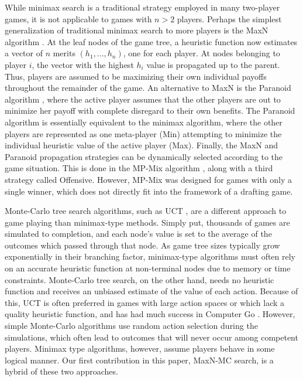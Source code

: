 \documentclass[letterpaper]{article}
\numberwithin{equation}{section}
\numberwithin{theorem}{section}
\numberwithin{lemma}{section}
\numberwithin{df}{section}
\begin{document}

While minimax search is a traditional strategy employed in many two-player games, it is not applicable to games with $n > 2$ players.  Perhaps the simplest generalization of traditional minimax search to more players is the MaxN algorithm \cite{MaxN}.  At the leaf nodes of the game tree, a heuristic function now estimates a vector of $n$ merits $(h_1, ..., h_n)$, one for each player.  At nodes belonging to player $i$, the vector with the highest $h_i$ value is propagated up to the parent.  Thus, players are assumed to be maximizing their own individual payoffs throughout the remainder of the game.  An alternative to MaxN is the Paranoid algorithm \cite{Paranoid}, where the active player assumes that the other players are out to minimize her payoff with complete disregard to their own benefits.  The Paranoid algorithm is essentially equivalent to the minimax algorithm, where the other players are represented as one meta-player (Min) attempting to minimize the individual heuristic value of the active player (Max).  Finally, the MaxN and Paranoid propagation strategies can be dynamically selected according to the game situation.  This is done in the MP-Mix algorithm \cite{ZuckFelnerKraus2009}, along with a third strategy called Offensive.  However, MP-Mix was designed for games with only a single winner, which does not directly fit into the framework of a drafting game.

Monte-Carlo tree search algorithms, such as UCT \cite{UCT}, are a different approach to game playing than minimax-type methods.  Simply put, thousands of games are simulated to completion, and each node's value is set to the average of the outcomes which passed through that node.  As game tree sizes typically grow exponentially in their branching factor, minimax-type algorithms must often rely on an accurate heuristic function at non-terminal nodes due to memory or time constraints.  Monte-Carlo tree search, on the other hand, needs no heuristic function and receives an unbiased estimate of the value of each action.  Because of this, UCT is often preferred in games with large action spaces or which lack a quality heuristic function, and has had much success in Computer Go \cite{ComputerGo}.  However, simple Monte-Carlo algorithms use random action selection during the simulations, which often lead to outcomes that will never occur among competent players.  Minimax type algorithms, however, assume players behave in some logical manner.  Our first contribution in this paper, MaxN-MC search, is a hybrid of these two approaches.
\end{document}
